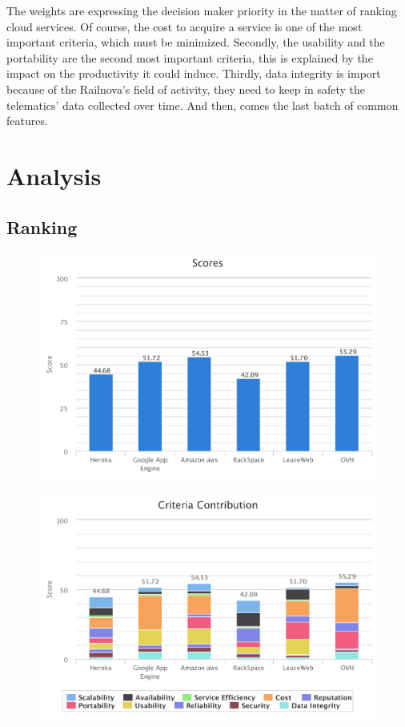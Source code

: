 \documentclass[a4paper,11pt]{article}
\begin{document}
The weights are expressing the decision maker priority in the matter of ranking cloud services. Of course, the cost to acquire a service is one of the most important criteria, which must be minimized. Secondly, the usability and the portability are the second most important criteria, this is explained by the impact on the productivity it could induce. Thirdly, data integrity is import because of the Railnova's field of activity, they need to keep in safety the telematics' data collected over time. And then, comes the last batch of common features.

\section{Analysis}

\subsection{Ranking}

\begin{figure}[h]
  \includegraphics[width=\textwidth]{img/Result/ranking.pdf}
\end{figure}

\begin{figure}[h]
  \includegraphics[width=\textwidth]{img/Result/criteria_contribution.pdf}
\end{figure}
\end{document}
